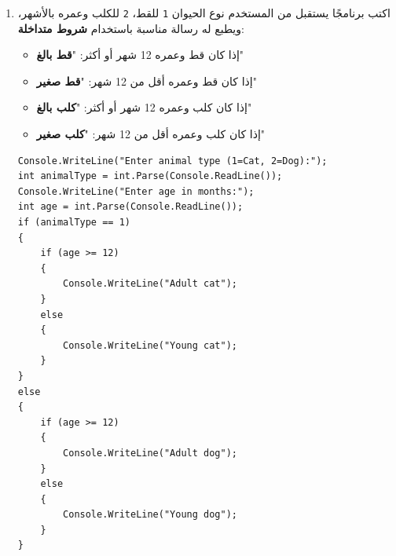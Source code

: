 \documentclass[14pt]{extarticle}
\begin{document}
\begin{enumerate}[resume, itemsep=2em]

\item
اكتب برنامجًا يستقبل من المستخدم نوع الحيوان \texttt{1} للقط، \texttt{2} للكلب وعمره بالأشهر، ويطبع له رسالة مناسبة باستخدام \textbf{شروط متداخلة}:
\begin{itemize}
\item إذا كان قط وعمره 12 شهر أو أكثر: "\textbf{قط بالغ}"
\item إذا كان قط وعمره أقل من 12 شهر: "\textbf{قط صغير}"
\item إذا كان كلب وعمره 12 شهر أو أكثر: "\textbf{كلب بالغ}"
\item إذا كان كلب وعمره أقل من 12 شهر: "\textbf{كلب صغير}"
\end{itemize}
\ifwithsols
\begin{boxSolution}
\begin{english}
\begin{verbatim}
Console.WriteLine("Enter animal type (1=Cat, 2=Dog):");
int animalType = int.Parse(Console.ReadLine());
Console.WriteLine("Enter age in months:");
int age = int.Parse(Console.ReadLine());
if (animalType == 1)
{
    if (age >= 12)
    {
        Console.WriteLine("Adult cat");
    }
    else
    {
        Console.WriteLine("Young cat");
    }
}
else
{
    if (age >= 12)
    {
        Console.WriteLine("Adult dog");
    }
    else
    {
        Console.WriteLine("Young dog");
    }
}
\end{verbatim}
\end{english}
\end{boxSolution}
\fi


\end{enumerate}
\end{document}

